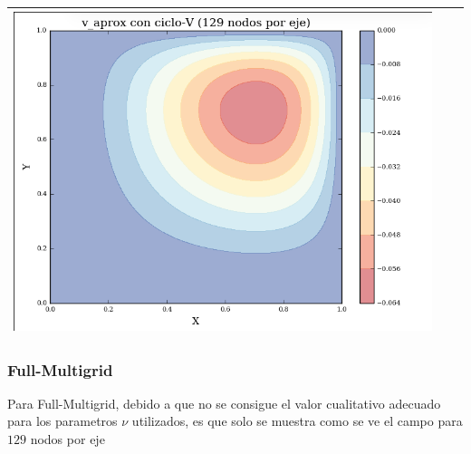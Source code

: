 \documentclass[letter,10pt]{article}
\begin{document}
\begin{table}[H]
\begin{tabular}[t]{|c|c|c|}
\includegraphics[scale=0.3]{img/v_cvRBGS129NFW} \\ \hline
\end{tabular}

\label{cualitvc}
\end{table}



\subsubsection{Full-Multigrid}
Para Full-Multigrid, debido a que no se consigue el valor cualitativo adecuado para los parametros $\nu$ utilizados, es que solo se muestra como se ve el campo para $129$ nodos por eje
\end{document}
